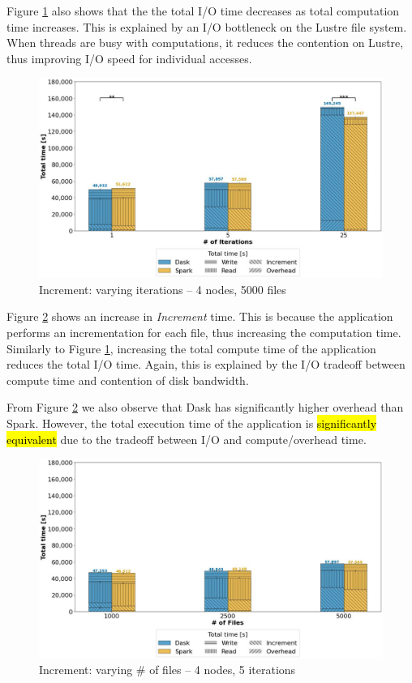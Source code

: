 \documentclass[AMA,STIX1COL]{WileyNJD-v2}
\newcommand{\HL}[1]{\hl{#1}}
\begin{document}
Figure \ref{fig:increment_itr} also shows that the the total I/O time decreases as total computation time increases.
This is explained by an I/O bottleneck on the Lustre file system.
When threads are busy with computations, it reduces the contention on Lustre, thus improving I/O speed for individual accesses.
\begin{figure}[!h]
	\centering
	\includegraphics[clip,width=0.75\columnwidth]{figures/stacked_increment_itr.jpg}
	\caption{Increment: varying iterations -- 4 nodes, 5000 files}
	\label{fig:increment_itr}
\end{figure}
							
Figure \ref{fig:increment_block} shows an increase in \textit{Increment} time.
This is because the application performs an incrementation for each file, thus increasing the computation time.
Similarly to Figure \ref{fig:increment_itr}, increasing the total compute time of the application reduces the total I/O time.
Again, this is explained by the I/O tradeoff between compute time and contention of disk bandwidth.
					
From Figure \ref{fig:increment_block} we also observe that Dask has significantly higher overhead than Spark.
However, the total execution time of the application is \HL{significantly equivalent} due to the tradeoff between I/O and compute/overhead time.
\begin{figure}[!h]
	\centering
	\includegraphics[clip,width=0.75\columnwidth]{figures/stacked_increment_block.jpg}
	\caption{Increment: varying \# of files -- 4 nodes, 5 iterations}
	\label{fig:increment_block}
\end{figure}
									
\end{document}
